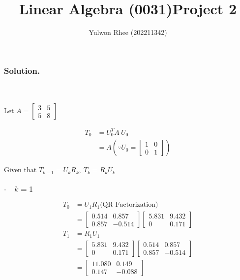 



\title{Linear Algebra (0031)\newline\space Project 2}
\author{Yulwon Rhee (202211342)}

\maketitle
\subsubsection{Solution.}\phantom{}\\\\
Let $A = \begin{bmatrix}
    3&5\\5&8
\end{bmatrix}$

\begin{align*}
    T_0 &= U_0^T A\ U_0\\
    &= A (\because U_0 = \begin{bmatrix}
        1&0\\0&1
        \end{bmatrix})
\end{align*}

Given that $T_{k-1} = U_k R_k,\ T_k=R_k U_k$

\subsubsection{$\cdot\quad k = 1$}
\begin{align*}
    T_0 &= U_1R_1\text{(QR Factorization)}\\
    &= \begin{bmatrix}
        0.514 & 0.857\\
        0.857 & -0.514
    \end{bmatrix} \begin{bmatrix}
        5.831 & 9.432\\
        0 & 0.171
    \end{bmatrix}
\end{align*}
\begin{align*}
    T_1 &= R_1U_1\\
    &= \begin{bmatrix}
        5.831 & 9.432\\
        0 & 0.171
    \end{bmatrix} \begin{bmatrix}
        0.514 & 0.857\\
        0.857 & -0.514
    \end{bmatrix}\\
    &= \begin{bmatrix}
        11.080 & 0.149\\
        0.147 & -0.088
    \end{bmatrix}
\end{align*}

